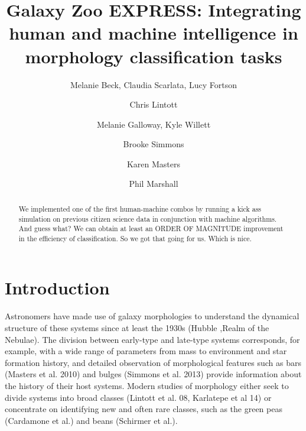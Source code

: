 \documentclass[twocolumn]{aastex6}
\begin{document}
\title{Galaxy Zoo EXPRESS: Integrating human and machine intelligence in morphology classification tasks}


\author{Melanie Beck, Claudia Scarlata, Lucy Fortson}%
\author{Chris Lintott}
\author{Melanie Galloway, Kyle Willett}
\author{Brooke Simmons}
\author{Karen Masters}
\author{Phil Marshall}


\begin{abstract}

We implemented one of the first human-machine combos by running a kick ass
simulation on previous citizen science data in conjunction with machine algorithms. 
And guess what? We can obtain at least an ORDER OF MAGNITUDE improvement in the 
efficiency of classification. So we got that going for us. Which is nice. 

\end{abstract}



\section{Introduction} \label{sec:intro}

Astronomers have made use of galaxy morphologies to understand the dynamical structure of these systems since at least the 1930s (Hubble ,Realm of the Nebulae). The division between early-type and late-type systems corresponds, for example, with a wide range of parameters from mass to environment and star formation history, and detailed observation of morphological features such as bars (Masters et al. 2010) and bulges (Simmons et al. 2013) provide information about the history of their host systems. Modern studies of morphology either seek to divide systems into broad classes (Lintott et al. 08, Karlatepe et al 14) or concentrate on identifying new and often rare classes, such as the green peas (Cardamone et al.) and beans (Schirmer et al.). 
\end{document}
